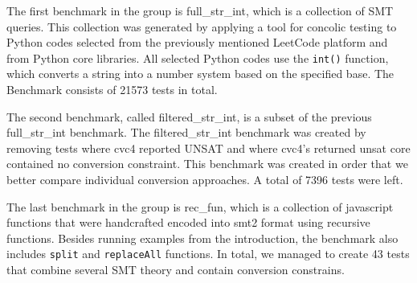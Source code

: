 The first benchmark in the group is full\_str\_int, which is a collection of SMT queries. This collection was generated by applying a tool for concolic testing to Python codes selected from the previously mentioned LeetCode platform and from Python core libraries. All selected Python codes use the \texttt{int()} function, which converts a string into a number system based on the specified base. The Benchmark consists of 21573 tests in total.

The second benchmark, called filtered\_str\_int, is a subset of the previous full\_str\_int benchmark. The filtered\_str\_int benchmark was created by removing tests where cvc4 reported UNSAT and where cvc4's returned unsat core contained no conversion constraint. This benchmark was created in order that we better compare individual conversion approaches. A total of 7396 tests were left.

The last benchmark in the group is rec\_fun, which is a collection of javascript functions that were handcrafted encoded into smt2 format using recursive functions. Besides running examples from the introduction, the benchmark also includes \texttt{split} and \texttt{replaceAll} functions. In total, we managed to create 43 tests that combine several SMT theory and contain conversion constrains.



